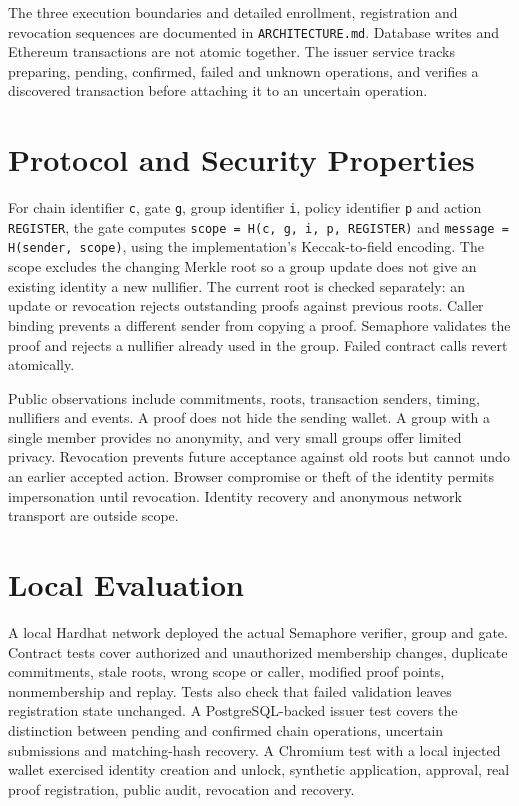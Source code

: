 \documentclass[conference]{IEEEtran}
\begin{document}
The three execution boundaries and detailed enrollment, registration and revocation sequences are documented in \texttt{ARCHITECTURE.md}. Database writes and Ethereum transactions are not atomic together. The issuer service tracks preparing, pending, confirmed, failed and unknown operations, and verifies a discovered transaction before attaching it to an uncertain operation.

\section{Protocol and Security Properties}
For chain identifier \texttt{c}, gate \texttt{g}, group identifier \texttt{i}, policy identifier \texttt{p} and action \texttt{REGISTER}, the gate computes \texttt{scope = H(c, g, i, p, REGISTER)} and \texttt{message = H(sender, scope)}, using the implementation's Keccak-to-field encoding. The scope excludes the changing Merkle root so a group update does not give an existing identity a new nullifier. The current root is checked separately: an update or revocation rejects outstanding proofs against previous roots. Caller binding prevents a different sender from copying a proof. Semaphore validates the proof \cite{contracts} and rejects a nullifier already used in the group. Failed contract calls revert atomically.

Public observations include commitments, roots, transaction senders, timing, nullifiers and events. A proof does not hide the sending wallet. A group with a single member provides no anonymity, and very small groups offer limited privacy. Revocation prevents future acceptance against old roots but cannot undo an earlier accepted action. Browser compromise or theft of the identity permits impersonation until revocation. Identity recovery and anonymous network transport are outside scope.

\section{Local Evaluation}
A local Hardhat network deployed the actual Semaphore verifier, group and gate. Contract tests cover authorized and unauthorized membership changes, duplicate commitments, stale roots, wrong scope or caller, modified proof points, nonmembership and replay. Tests also check that failed validation leaves registration state unchanged. A PostgreSQL-backed issuer test covers the distinction between pending and confirmed chain operations, uncertain submissions and matching-hash recovery. A Chromium test with a local injected wallet exercised identity creation and unlock, synthetic application, approval, real proof registration, public audit, revocation and recovery.
\end{document}
